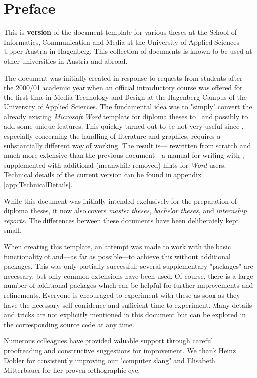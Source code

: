 \chapter{Preface} %

This is \textbf{version \hgbDate} of the \latex document template for various
theses at the School of Informatics, Communication and Media at the University
of Applied Sciences Upper Austria in Hagenberg. This collection of documents is
known to be used at other universities in Austria and abroad.

The document was initially created in response to requests from students after
the 2000/01 academic year when an official \latex introductory course was
offered for the first time in Media Technology and Design at the Hagenberg
Campus of the University of Applied Sciences. The fundamental idea was to
"simply" convert the already existing \emph{Microsoft Word} template for
diploma theses to \latex\ and possibly to add some unique features. This quickly
turned out to be not very useful since \latex, especially concerning the
handling of literature and graphics, requires a substantially different way of
working. The result is--- rewritten from scratch and much more extensive than
the previous document---a manual for writing with \latex, supplemented with
additional (meanwhile removed) hints for \emph{Word} users. Technical details
of the current version can be found in appendix \ref{app:TechnicalDetails}.

While this document was initially intended exclusively for the preparation
of diploma theses, it now also covers \emph{master theses},
\emph{bachelor theses}, and \emph{internship reports}. The differences between
these documents have been deliberately kept small.

When creating this template, an attempt was made to work with the basic
functionality of \latex and---as far as possible---to achieve this without
additional packages. This was only partially successful; several supplementary
"packages" are necessary, but only common extensions have been used. Of course,
there is a large number of additional packages which can be helpful for further
improvements and refinements. Everyone is encouraged to experiment with these as
soon as they have the necessary self-confidence and sufficient time to
experiment. Many details and tricks are not explicitly mentioned in this
document but can be explored in the corresponding source code at any time.

Numerous colleagues have provided valuable support through careful proofreading
and constructive suggestions for improvement. We thank Heinz Dobler for
consistently improving our "computer slang" and Elisabeth Mitterbauer for her
proven orthographic eye.

